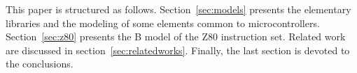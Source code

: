 \documentclass[a4paper]{llncs}
\begin{document}
%

This paper is structured as follows.  Section~\ref{sec:models}
presents the elementary libraries and the modeling of some elements
common to microcontrollers.  Section~\ref{sec:z80} presents the B
model of the Z80 instruction set.  Related work are discussed in
section~\ref{sec:relatedworks}. Finally, the last section is devoted
to the conclusions.
\end{document}
